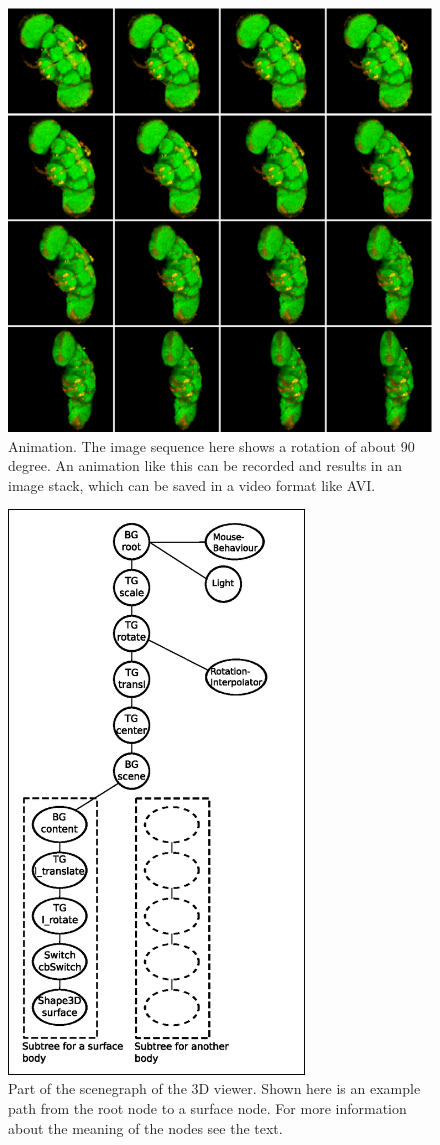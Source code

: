 \documentclass[a4paper,10pt]{article}
\begin{document}
\begin{figure}[m]
\includegraphics[width=\textwidth]{images/animation.eps}
\caption{Animation. The image sequence here shows a rotation of about 90 degree. An animation like this can be recorded and results in an image stack, which can be saved in a video format like AVI.}
\label{fig:animation}
\end{figure}

\begin{figure}[m]
\includegraphics[width=0.7\textwidth]{images/scenegraph.eps}
\caption{Part of the scenegraph of the 3D viewer. Shown here is an example path from the root node to a surface node. For more information about the meaning of the nodes see the text.}
\label{fig:scenegraph}
\end{figure}
\end{document}
